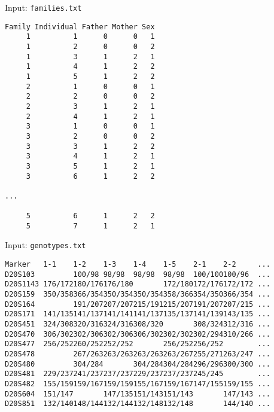 \documentclass[12pt,t]{beamer}
\begin{document}
\begin{frame}[fragile]{Input: \tt families.txt}

\vspace{18pt}

\begin{lstlisting}
Family Individual Father Mother Sex
     1          1      0      0   1
     1          2      0      0   2
     1          3      1      2   1
     1          4      1      2   2
     1          5      1      2   2
     2          1      0      0   1
     2          2      0      0   2
     2          3      1      2   1
     2          4      1      2   1
     3          1      0      0   1
     3          2      0      0   2
     3          3      1      2   2
     3          4      1      2   1
     3          5      1      2   1
     3          6      1      2   2

...

     5          6      1      2   2
     5          7      1      2   1
\end{lstlisting}

\end{frame}
\begin{frame}[c,fragile]{Input: \tt genotypes.txt}

\begin{lstlisting}
Marker   1-1    1-2    1-3    1-4    1-5    2-1    2-2     ...
D20S103         100/98 98/98  98/98  98/98  100/100100/96  ...
D20S1143 176/172180/176176/180       172/180172/176172/172 ...
D20S159  350/358366/354350/354350/354358/366354/350366/354 ...
D20S164         191/207207/207215/191215/207191/207207/215 ...
D20S171  141/135141/137141/141141/137135/137141/139143/135 ...
D20S451  324/308320/316324/316308/320       308/324312/316 ...
D20S470  306/302302/306302/306306/302302/302302/294310/266 ...
D20S477  256/252260/252252/252       256/252256/252        ...
D20S478         267/263263/263263/263263/267255/271263/247 ...
D20S480         304/284       304/284304/284296/296300/300 ...
D20S481  229/237241/237237/237229/237237/237245/245        ...
D20S482  155/159159/167159/159155/167159/167147/155159/155 ...
D20S604  151/147       147/135151/143151/143       147/143 ...
D20S851  132/140148/144132/144132/148132/148       144/140 ...
\end{lstlisting}

\end{frame}
\end{document}
